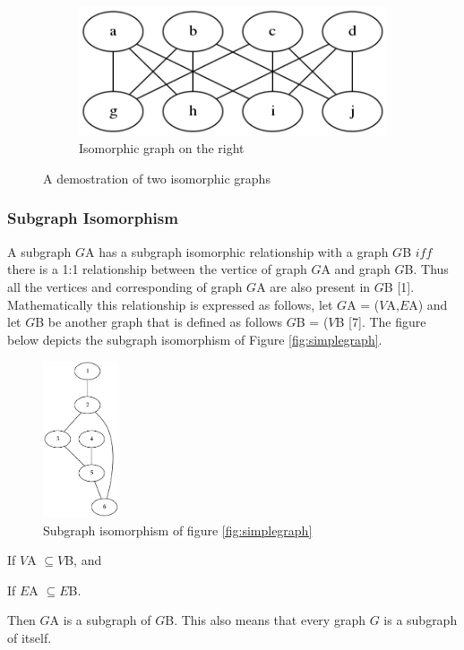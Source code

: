 \begin{figure}[H]
\begin{subfigure}[b]{0.4\textwidth}
    \includegraphics[width=\textwidth]{isomorphismright}
    \caption{Isomorphic graph on the right}
    \label{fig:isomorphism}
  \end{subfigure}
  \caption{A demostration of two isomorphic graphs}
\end{figure}

\subsubsection{Subgraph Isomorphism}
A subgraph $G${\tiny A}  has a subgraph isomorphic relationship with a graph $G${\tiny B} $iff$ there is a 1:1 relationship between the vertice of graph 
$G${\tiny A} and graph $G${\tiny B}. Thus all the vertices and corresponding of graph $G${\tiny A} are also present in $G${\tiny B} [1]. Mathematically this
relationship is expressed as follows, let $G${\tiny A} = ($V${\tiny A},$E${\tiny A}) and let $G${\tiny B} be another graph that is defined as 
follows $G${\tiny B} = ($V${\tiny B} [7]. The figure below depicts the subgraph isomorphism of Figure \ref{fig:simplegraph}.
\begin{figure}[H]
  \begin{center}
      \includegraphics[width=0.2\textwidth]{subgraph.png}
  \end{center}    
  \caption{Subgraph isomorphism of figure \ref{fig:simplegraph}}
  \label{fig:isomorphism_subgraph}
\end{figure}
\begin{myEnumerate}
  \item If $V${\tiny A} $ \subseteq V${\tiny B}, and
  \item If $E${\tiny A} $ \subseteq E${\tiny B}.
\end{myEnumerate}
Then $G${\tiny A} is a subgraph of $G${\tiny B}. This also means that every graph $G$ is a subgraph of itself.
\newpage